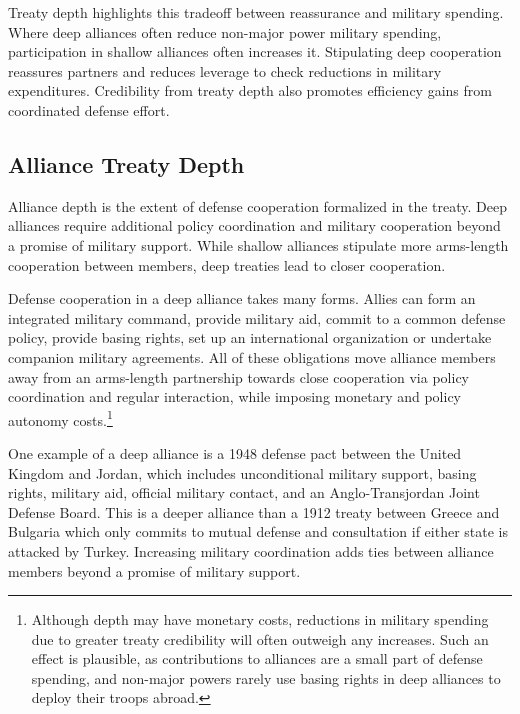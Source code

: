\documentclass[12pt]{article}
\begin{document}
Treaty depth highlights this tradeoff between reassurance and military spending.
Where deep alliances often reduce non-major power military spending, participation in shallow alliances often increases it. 
Stipulating deep cooperation reassures partners and reduces leverage to check reductions in military expenditures. 
Credibility from treaty depth also promotes efficiency gains from coordinated defense effort.



\subsection{Alliance Treaty Depth} 


Alliance depth is the extent of defense cooperation formalized in the treaty. 
Deep alliances require additional policy coordination and military cooperation beyond a promise of military support. 
While shallow alliances stipulate more arms-length cooperation between members, deep treaties lead to closer cooperation. 


Defense cooperation in a deep alliance takes many forms. 
Allies can form an integrated military command, provide military aid, commit to a common defense policy, provide basing rights, set up an international organization or undertake companion military agreements. 
All of these obligations move alliance members away from an arms-length partnership towards close cooperation via policy coordination and regular interaction, while imposing monetary and policy autonomy costs.\footnote{Although depth may have monetary costs, reductions in military spending due to greater treaty credibility will often outweigh any increases. Such an effect is plausible, as contributions to alliances are a small part of defense spending, and non-major powers rarely use basing rights in deep alliances to deploy their troops abroad.} 

 
One example of a deep alliance is a 1948 defense pact between the United Kingdom and Jordan, which includes unconditional military support, basing rights, military aid, official military contact, and an Anglo-Transjordan Joint Defense Board.  
This is a deeper alliance than a 1912 treaty between Greece and Bulgaria which only commits to mutual defense and consultation if either state is attacked by Turkey. 
Increasing military coordination adds ties between alliance members beyond a promise of military support.
\end{document}
